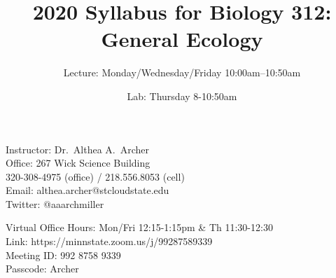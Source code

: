 \documentclass{tufte-handout}
\title{2020 Syllabus for Biology 312: General Ecology}										%
\author{Lecture: Monday/Wednesday/Friday 10:00am--10:50am}										%
\date{Lab: Thursday 8-10:50am}
\begin{document}
\maketitle

Instructor: Dr.~Althea A.~Archer\\
Office: 267 Wick Science Building\\
320-308-4975 (office) / 218.556.8053 (cell)\\
Email: althea.archer@stcloudstate.edu\\
Twitter: @aaarchmiller

Virtual Office Hours: Mon/Fri 12:15-1:15pm \& Th 11:30-12:30\\
Link: https://minnstate.zoom.us/j/99287589339\\
Meeting ID: 992 8758 9339\\
Passcode: Archer
\end{document}

